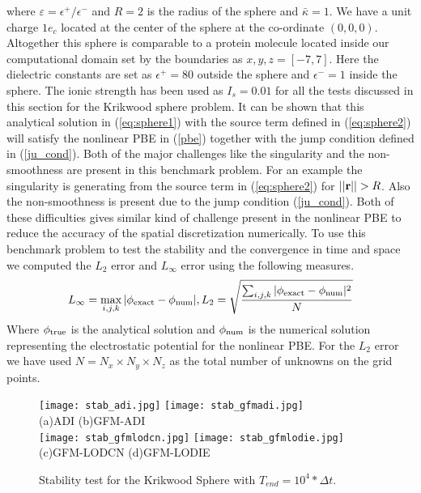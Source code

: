 where $\varepsilon=\epsilon^+ / \epsilon^-$ and $R=2$ is the radius of the sphere and $\bar{\kappa}=1$. We have a unit charge $1e_c$ located at the center of the sphere at the co-ordinate $(0,0,0)$. Altogether this sphere is comparable to a protein molecule located inside our computational domain set by the boundaries as $x,y,z=[-7,7]$.  Here the dielectric constants are set as $\epsilon^+=80$ outside the sphere and $\epsilon^-=1$ inside the sphere. The ionic strength has been used as $I_s = 0.01$ for all the tests discussed in this section for the Krikwood sphere problem. It can be shown that this analytical solution in (\ref{eq:sphere1}) with the source term defined in (\ref{eq:sphere2}) will satisfy the nonlinear PBE in (\ref{pbe}) together with the jump condition defined in (\ref{ju_cond}). Both of the major challenges like the singularity and the non-smoothness are present in this benchmark problem. For an example the singularity is generating from the source term in (\ref{eq:sphere2}) for $||{\bf r}|| >R$. Also the non-smoothness is present due to the jump condition (\ref{ju_cond}). Both of these difficulties gives similar kind of challenge present in the nonlinear PBE to reduce the accuracy of the spatial discretization numerically. To use this benchmark problem to test the stability and the convergence in time and space we computed the $L_2$ error and $L_\infty$ error using the following measures. 
\begin{equation}
	L_\infty=\max\limits_{i,j,k}|\phi_{\rm exact}-\phi_{\rm num}|, L_2 = \sqrt{\frac{\sum_{i,j,k}|\phi_{\rm exact}-\phi_{\rm num}|^2}{N}}\label{eq:l2lmax}
\end{equation}
Where $\phi_{\rm true}$ is the analytical solution and $\phi_{\rm num}$ is the numerical solution representing the electrostatic potential for the nonlinear PBE. For the $L_2$ error we have used $N= N_x \times N_y \times N_z$ as the total number of unknowns on the grid points. 
\begin{figure}[!ht]
	\centering
	\texttt{[image: stab\_adi.jpg]}
	\texttt{[image: stab\_gfmadi.jpg]}\\
	(a)ADI\hspace*{2.5in} (b)GFM-ADI\\ 	
	\texttt{[image: stab\_gfmlodcn.jpg]}
	\texttt{[image: stab\_gfmlodie.jpg]}\\
	(c)GFM-LODCN \hspace*{2in} (d)GFM-LODIE
	\caption{Stability test for the Krikwood Sphere with $T_{end}= 10^4*\Delta t$.}
	\label{fig:stab_krik}	
\end{figure}

